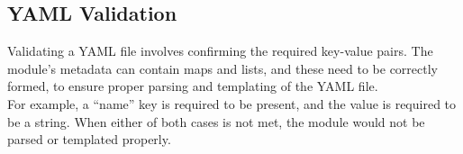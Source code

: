 \subsection{YAML Validation}
Validating a YAML file involves confirming the required key-value pairs. The module’s metadata can contain maps and lists, and these need to be correctly formed, to ensure proper parsing and templating of the YAML file.\\
For example, a “name” key is required to be present, and the value is required to be a string. When either of both cases is not met, the module would not be parsed or templated properly.
